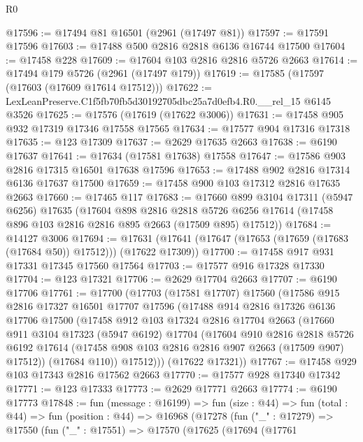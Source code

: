 \begin{lexlean}{R0}
\begin{coremodule}
@17596 := @17494 @81 @16501 (@2961 (@17497 @81))
@17597 := @17591 @17596
@17603 := @17488 @500 @2816 @2818 @6136 @16744 @17500
@17604 := @17458 @228
@17609 := @17604 @103 @2816 @2816 @5726 @2663
@17614 := @17494 @179 @5726 (@2961 (@17497 @179))
@17619 := @17585 (@17597 (@17603 (@17609 @17614 @17512)))
@17622 := LexLeanPreserve.C1f5fb70fb5d30192705dbc25a7d0efb4.R0.__rel_15 @6145 @3526
@17625 := @17576 (@17619 (@17622 @3006))
@17631 := @17458 @905 @932 @17319 @17346 @17558 @17565
@17634 := @17577 @904 @17316 @17318
@17635 := @123 @17309
@17637 := @2629 @17635 @2663
@17638 := @6190 @17637
@17641 := @17634 (@17581 @17638) @17558
@17647 := @17586 @903 @2816 @17315 @16501 @17638 @17596
@17653 := @17488 @902 @2816 @17314 @6136 @17637 @17500
@17659 := @17458 @900 @103 @17312 @2816 @17635 @2663
@17660 := @17465 @117
@17683 := @17660
    @899
    @3104
    @17311
    (@5947 @6256)
    @17635
    (@17604
      @898
      @2816
      @2818
      @5726
      @6256
      @17614
      (@17458 @896 @103 @2816 @2816 @895 @2663 (@17509 @895) @17512))
@17684 := @14127 @3006
@17694 := @17631 (@17641 (@17647 (@17653 (@17659 (@17683 (@17684 @50)) @17512))) (@17622 @17309))
@17700 := @17458 @917 @931 @17331 @17345 @17560 @17564
@17703 := @17577 @916 @17328 @17330
@17704 := @123 @17321
@17706 := @2629 @17704 @2663
@17707 := @6190 @17706
@17761 := @17700
    (@17703
      (@17581 @17707)
      @17560
      (@17586
        @915
        @2816
        @17327
        @16501
        @17707
        @17596
        (@17488
          @914
          @2816
          @17326
          @6136
          @17706
          @17500
          (@17458
            @912
            @103
            @17324
            @2816
            @17704
            @2663
            (@17660
              @911
              @3104
              @17323
              (@5947 @6192)
              @17704
              (@17604
                @910
                @2816
                @2818
                @5726
                @6192
                @17614
                (@17458 @908 @103 @2816 @2816 @907 @2663 (@17509 @907) @17512))
              (@17684 @110))
            @17512)))
      (@17622 @17321))
@17767 := @17458 @929 @103 @17343 @2816 @17562 @2663
@17770 := @17577 @928 @17340 @17342
@17771 := @123 @17333
@17773 := @2629 @17771 @2663
@17774 := @6190 @17773
@17848 := fun (message : @16199) =>
  fun (size : @44) =>
  fun (total : @44) =>
  fun (position : @44) =>
  @16968
    (@17278
      (fun ("_" : @17279) =>
      @17550
        (fun ("_" : @17551) =>
        @17570
          (@17625
            (@17694
              (@17761

\end{coremodule}
\end{lexlean}
